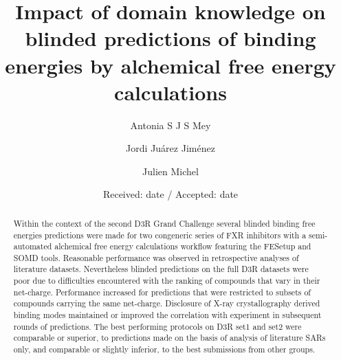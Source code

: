 \documentclass{svjour3}                     %
\begin{document}
\sloppy

\title{Impact of domain knowledge on blinded predictions of binding energies by alchemical free energy calculations}%

\author{Antonia S J S Mey        \and
        Jordi Ju\'arez Jim\'enez           \and
        Julien Michel %
}



\date{Received: date / Accepted: date}


\maketitle

\begin{abstract}

Within the context of the second D3R Grand Challenge several blinded binding free energies predictions were made for two congeneric series of FXR inhibitors with a semi-automated alchemical free energy calculations workflow featuring the FESetup and SOMD tools.  Reasonable performance was observed in retrospective analyses of literature datasets. Nevertheless blinded predictions on the full D3R datasets were poor due to difficulties encountered with the ranking of compounds that vary in their net-charge.  Performance increased for predictions that were restricted to subsets of compounds carrying the same net-charge.  Disclosure of X-ray crystallography derived binding modes maintained or improved the correlation with experiment in subsequent rounds of predictions.  The best performing protocols on D3R set1 and set2 were comparable or superior, to predictions made on the basis of analysis of literature SARs only, and comparable or slightly inferior, to the best submissions from other groups.
 
\end{abstract}
\end{document}
